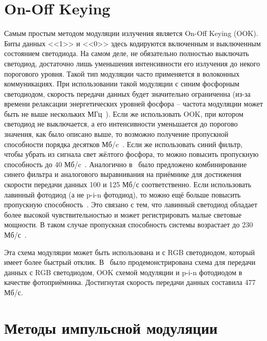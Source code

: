\section{On-Off Keying}


Самым простым методом модуляции излучения является On-Off Keying (OOK). Биты данных <<1>> и <<0>> здесь кодируются включенным и выключенным состоянием светодиода. На самом деле, не обязательно полностью выключать светодиод, достаточно лишь уменьшения интенсивности его излучения до некого порогового уровня. Такой тип модуляции часто применяется в волоконных коммуникациях. При использовании такой модуляции с синим фосфорным светодиодом, скорость передачи данных будет значительно ограниченна (из-за времени релаксации энергетических уровней фосфора \--- частота модуляции может быть не выше нескольких МГц~\cite{Grubor2007}). Если же использовать OOK, при котором светодиод не выключается, а его интенсивности уменьшается до порогово значения, как было описано выше, то возможно получение пропускной способности порядка десятков Мб/c~\cite{Park2007}. Если же использовать синий фильтр, чтобы убрать из сигнала свет жёлтого фосфора, то можно повысить пропускную способность до 40 Мб/c~\cite{Grubor2007}. Аналогично в~\cite{Minh2008,Vucic2009} было предложено комбинирование синего фильтра и аналогового выравнивания на приёмнике для достижения скорости передачи данных 100 и 125 Мб/с соответственно. Если использовать лавинный фотодиод (а не p-i-n фотодиод), то можно ещё больше повысить пропускную способность~\cite{Vucic2010}. Это связано с тем, что лавинный светодиод обладает более высокой чувствительностью и может регистрировать малые световые мощности. В таком случае пропускная способность системы возрастает до 230 Мб/с~\cite{Vucic2010}. 

Эта схема модуляции может быть использована и с RGB светодиодом, который имеет более быстрый отклик. В~\cite{Fujimoto2013} было продемонстрирована схема для передачи данных с RGB светодиодом, OOK схемой модуляции и p-i-n фотодиодом в качестве фотоприёмника. Достигнутая скорость передачи данных составила 477 Мб/с.

\section{Методы импульсной модуляции}


